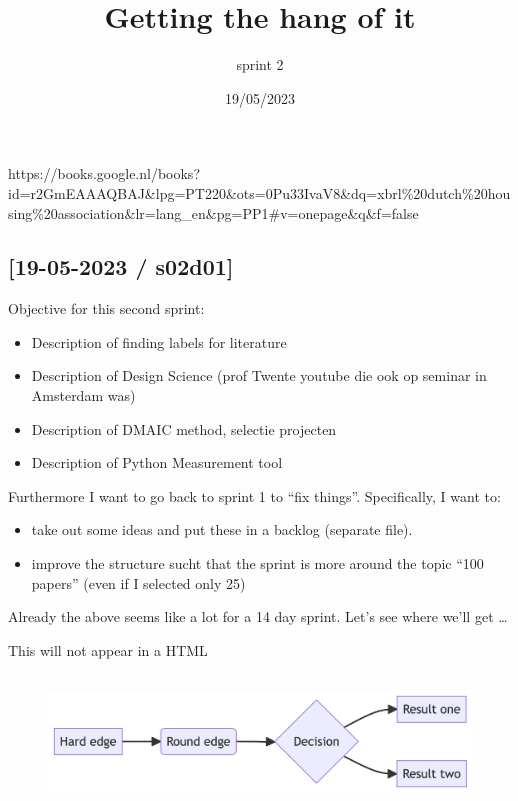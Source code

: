 \documentclass[
  letterpaper,
  DIV=11,
  numbers=noendperiod]{scrartcl}
\title{Getting the hang of it}
\subtitle{sprint 2}
\author{}
\date{19/05/2023}
\providecommand{\tightlist}{%
  \setlength{\itemsep}{0pt}\setlength{\parskip}{0pt}}\usepackage{longtable,booktabs,array}
\renewcommand*\contentsname{Table of contents}
\newcommand\contentsname{Table of contents}
\begin{document}
\maketitle
\ifdefined\Shaded\renewenvironment{Shaded}{\begin{tcolorbox}[borderline west={3pt}{0pt}{shadecolor}, frame hidden, breakable, interior hidden, boxrule=0pt, sharp corners, enhanced]}{\end{tcolorbox}}\fi

\renewcommand*\contentsname{Table of contents}
{
\hypersetup{linkcolor=}
\setcounter{tocdepth}{2}
\tableofcontents
}
https://books.google.nl/books?id=r2GmEAAAQBAJ\&lpg=PT220\&ots=0Pu33IvaV8\&dq=xbrl\%20dutch\%20housing\%20association\&lr=lang\_en\&pg=PP1\#v=onepage\&q\&f=false

\hypertarget{s02d01}{%
\subsection{{[}19-05-2023 / s02d01{]}}\label{s02d01}}

Objective for this second sprint:

\begin{itemize}
\tightlist
\item
  Description of finding labels for literature
\item
  Description of Design Science (prof Twente youtube die ook op seminar
  in Amsterdam was)
\item
  Description of DMAIC method, selectie projecten
\item
  Description of Python Measurement tool
\end{itemize}

Furthermore I want to go back to sprint 1 to ``fix things''.
Specifically, I want to:

\begin{itemize}
\tightlist
\item
  take out some ideas and put these in a backlog (separate file).
\item
  improve the structure sucht that the sprint is more around the topic
  ``100 papers'' (even if I selected only 25)
\end{itemize}

Already the above seems like a lot for a 14 day sprint. Let's see where
we'll get \ldots{}

This will not appear in a HTML

\begin{figure}[H]

{\centering \includegraphics[width=5.74in,height=1.4in]{s3_methods_files/figure-latex/mermaid-figure-1.png}

}

\end{figure}
\end{document}
